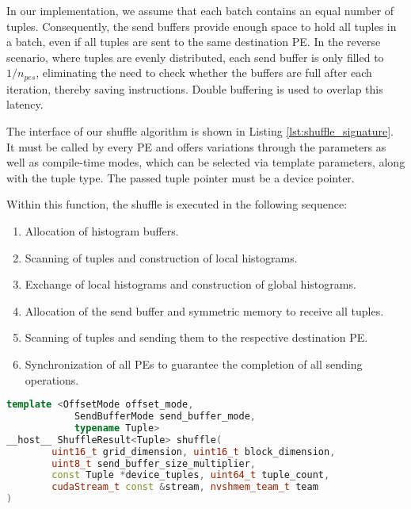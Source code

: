 In our implementation, we assume that each batch contains an equal number of tuples. Consequently, the send buffers provide enough space to hold all tuples in a batch, even if all tuples are sent to the same destination PE. In the reverse scenario, where tuples are evenly distributed, each send buffer is only filled to $ 1 / n_{pes} $, eliminating the need to check whether the buffers are full after each iteration, thereby saving instructions. Double buffering is used to overlap this latency.

The interface of our shuffle algorithm is shown in Listing \ref{lst:shuffle_signature}. It must be called by every PE and offers variations through the parameters as well as compile-time modes, which can be selected via template parameters, along with the tuple type. The passed tuple pointer must be a device pointer.

Within this function, the shuffle is executed in the following sequence:
\begin{enumerate}
    \item  Allocation of histogram buffers.
    \item Scanning of tuples and construction of local histograms.
    \item Exchange of local histograms and construction of global histograms.
    \item Allocation of the send buffer and symmetric memory to receive all tuples.
    \item Scanning of tuples and sending them to the respective destination PE.
    \item Synchronization of all PEs to guarantee the completion of all sending operations.
\end{enumerate}

\begin{lstlisting}[float=htbp, language=C++,caption={Interface of our suffle algorithm},label=lst:shuffle_signature]
template <OffsetMode offset_mode,
            SendBufferMode send_buffer_mode,
            typename Tuple>
__host__ ShuffleResult<Tuple> shuffle(
        uint16_t grid_dimension, uint16_t block_dimension,
        uint8_t send_buffer_size_multiplier,
        const Tuple *device_tuples, uint64_t tuple_count,
        cudaStream_t const &stream, nvshmem_team_t team
)
\end{lstlisting}
